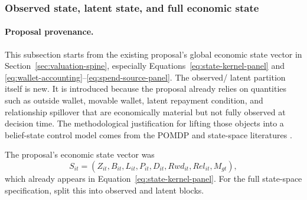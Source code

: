 \documentclass[11pt]{article}
\newcommand{\1}{\mathbf{1}}
\begin{document}
\subsubsection{Observed state, latent state, and full economic state}
\label{subsec:state-space-state-decomp}

\paragraph{Proposal provenance.}
This subsection starts from the existing proposal's global economic state vector
in Section~\ref{sec:valuation-spine}, especially
Equations~\eqref{eq:state-kernel-panel} and
\eqref{eq:wallet-accounting}--\eqref{eq:spend-source-panel}. The observed/
latent partition itself is new. It is introduced because the proposal already
relies on quantities such as outside wallet, movable wallet, latent repayment
condition, and relationship spillover that are economically material but not
fully observed at decision time. The methodological justification for lifting
those objects into a belief-state control model comes from the POMDP and
state-space literatures
\citep{smallwood1973pomdp,kaelbling1998pomdp,durbinkoopman2012ssm,
westharrison1997bfdm}.

The proposal's economic state vector was
\begin{equation}
  S_{it}
  =
  (Z_{it},B_{it},L_{it},P_{it},D_{it},Rwd_{it},Rel_{it},M_{gt}),
  \label{eq:ss-proposal-state-recall}
\end{equation}
which already appears in Equation~\eqref{eq:state-kernel-panel}. For the full
state-space specification, split this into observed and latent blocks.
\end{document}
